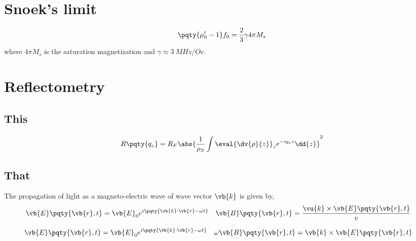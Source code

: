 
\section{Snoek's limit} %
\label{sec:snoek_s_limit}

\begin{align*}
	\pqty{\mu_0^\prime - 1} f_0 = \frac{2}{3}\gamma 4\pi M_s
\end{align*} where $4\pi M_s$ is the saturation magnetization and $\gamma \approx \SI{3}{MHz/Oe}$.


\section{Reflectometry} %
\label{sec:reflectometry}

\subsection{This} %
\label{sub:this}

\begin{align*}
	R\pqty{q_z} = R_F\abs{\frac{1}{\rho_S}\int \eval{\dv{\rho}{z}}_z e^{-iq_z z}\dd{z}}^2
\end{align*}


\subsection{That} %
\label{sub:that}


The propagation of light as a magneto-electric wave of wave vector $\vb{k}$ is given by,
\begin{align*}
	\vb{E}\pqty{\vb{r},t} &= \vb{E}_{0}e^{i\pqty{\vb{k}\cdot\vb{r} - \omega t}} & \vb{B}\pqty{\vb{r},t} &= \frac{\vu{k}\times\vb{E}\pqty{\vb{r},t}}{v}
\end{align*}

\begin{align*}
	\vb{E}\pqty{\vb{r},t} &= \vb{E}_{0}e^{i\pqty{\vb{k}\cdot\vb{r} - \omega t}} & \omega \vb{B}\pqty{\vb{r},t} &= \vb{k}\times\vb{E}\pqty{\vb{r},t}
\end{align*}

